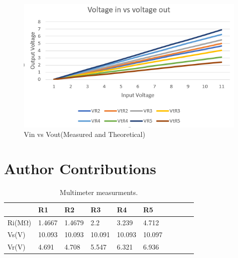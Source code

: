 \documentclass[10pt,twocolumn]{article}
\begin{document}
\begin{figure}
	\centering
	\includegraphics[width=.9\linewidth]{figures/Vin vs Vout.PNG}
	\caption{Vin vs Vout(Measured and Theoretical)}
	\label{fig:vin/out}
\end{figure}

\section{Author Contributions}



 
\begin{table}
	\begin{tabularx}{1\linewidth}{ lXXXXX|cXXX }
		\hline
		 & \textbf{R1} & \textbf{R2} & \textbf{R3} & \textbf{R4} & \textbf{R5}\\
		\hline
		Ri(MΩ) & 1.4667 & 1.4679 & 2.2 & 3.239 & 4.712 \\
		\cline{1-6}
		Vs(V) & 10.093 & 10.093 & 10.091 & 10.093 & 10.097 \\
		\cline{1-6}
		Vr(V) & 4.691 & 4.708 & 5.547 & 6.321 & 6.936 \\
		\hline
	\end{tabularx}
	\caption{Multimeter measurments.}
	\label{tab:Tab1}
\end{table}
\end{document}
